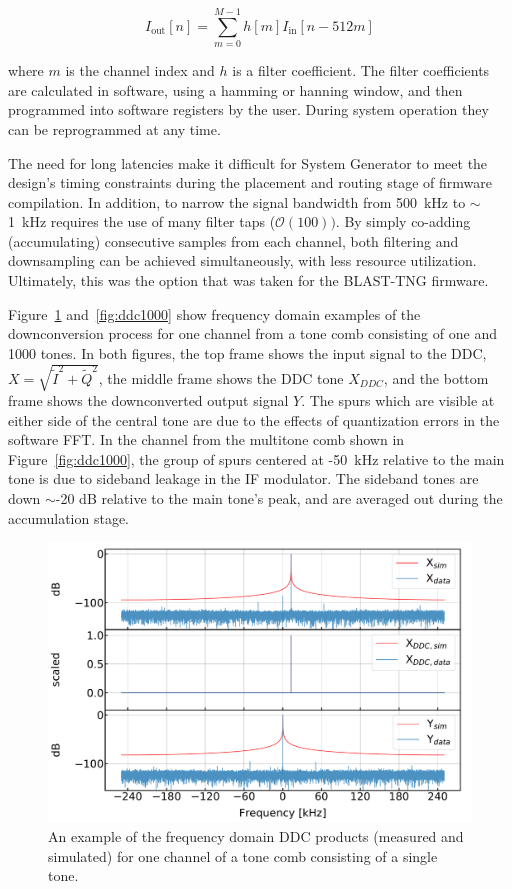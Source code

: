 \begin{equation}
  I_{\mathrm{out}}[n] = \sum _{m=0}^{M - 1} h[m]I_{\mathrm{in}}[n - 512m]
\end{equation}

where $m$ is the channel index and $h$ is a filter coefficient. The filter coefficients are calculated in software, using a hamming or hanning window, and then programmed into software registers by the user. During system operation they can be reprogrammed at any time.

The need for long latencies make it difficult for System Generator to meet the design's timing constraints during the placement and routing stage of firmware compilation. In addition, to narrow the signal bandwidth from 500~kHz to $\sim$1~kHz requires the use of many filter taps ($\mathcal{O}(100))$. By simply co-adding (accumulating) consecutive samples from each channel, both filtering and downsampling can be achieved simultaneously, with less resource utilization. Ultimately, this was the option that was taken for the BLAST-TNG firmware.

Figure~\ref{fig:ddc1} and~\ref{fig:ddc1000} show frequency domain examples of the downconversion process for one channel from a tone comb consisting of one and 1000 tones. In both figures, the top frame shows the input signal to the DDC, $X = \sqrt{\widetilde{I}^{2} + \widetilde{Q}^{2}}$, the middle frame shows the DDC tone $X_{DDC}$, and the bottom frame shows the downconverted output signal $Y$. The spurs which are visible at either side of the central tone are due to the effects of quantization errors in the software FFT. In the channel from the multitone comb shown in Figure~\ref{fig:ddc1000}, the group of spurs centered at -50~kHz relative to the main tone is due to sideband leakage in the IF modulator. The sideband tones are down $\sim$-20 dB relative to the main tone's peak, and are averaged out during the accumulation stage.

\begin{figure}[!htbp]
\centering
\includegraphics[width=\textwidth]{figures/readout/sim/ddc_sim_0}
\caption[~An example of the frequency domain DDC products (measured and simulated) for one channel of a tone comb consisting of a single tone.]{An example of the frequency domain DDC products (measured and simulated) for one channel of a tone comb consisting of a single tone.}
\label{fig:ddc1}
\end{figure}

